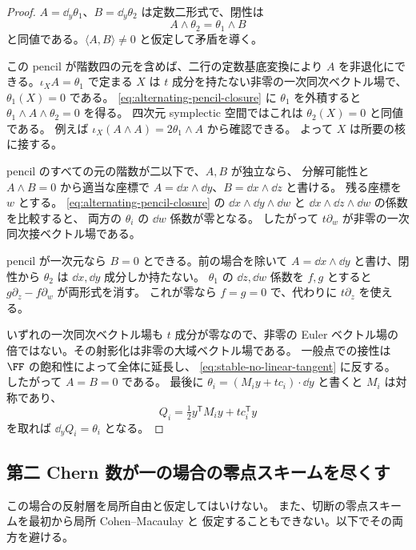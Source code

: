 \begin{proof}
$A=\dd_y\theta_1$、$B=\dd_y\theta_2$ は定数二形式で、閉性は
\begin{equation}
 A\wedge\theta_2=\theta_1\wedge B
 \label{eq:alternating-pencil-closure}
\end{equation}
と同値である。$\langle A,B\rangle\neq0$ と仮定して矛盾を導く。

この pencil が階数四の元を含めば、二行の定数基底変換により
$A$ を非退化にできる。$\iota_XA=\theta_1$ で定まる $X$ は
$t$ 成分を持たない非零の一次同次ベクトル場で、
$\theta_1(X)=0$ である。
\eqref{eq:alternating-pencil-closure} に $\theta_1$ を外積すると
$\theta_1\wedge A\wedge\theta_2=0$ を得る。
四次元 symplectic 空間ではこれは $\theta_2(X)=0$ と同値である。
例えば $\iota_X(A\wedge A)=2\theta_1\wedge A$ から確認できる。
よって $X$ は所要の核に接する。

pencil のすべての元の階数が二以下で、$A,B$ が独立なら、
分解可能性と $A\wedge B=0$ から適当な座標で
$A=\dd x\wedge\dd y$、$B=\dd x\wedge\dd z$ と書ける。
残る座標を $w$ とする。
\eqref{eq:alternating-pencil-closure} の
$\dd x\wedge\dd y\wedge\dd w$ と
$\dd x\wedge\dd z\wedge\dd w$ の係数を比較すると、
両方の $\theta_i$ の $\dd w$ 係数が零となる。
したがって $t\partial_w$ が非零の一次同次接ベクトル場である。

pencil が一次元なら $B=0$ とできる。前の場合を除いて
$A=\dd x\wedge\dd y$ と書け、閉性から $\theta_2$ は
$\dd x,\dd y$ 成分しか持たない。
$\theta_1$ の $\dd z,\dd w$ 係数を $f,g$ とすると
$g\partial_z-f\partial_w$ が両形式を消す。
これが零なら $f=g=0$ で、代わりに $t\partial_z$ を使える。

いずれの一次同次ベクトル場も $t$ 成分が零なので、非零の Euler
ベクトル場の倍ではない。その射影化は非零の大域ベクトル場である。
一般点での接性は $\FF$ の飽和性によって全体に延長し、
\eqref{eq:stable-no-linear-tangent} に反する。
したがって $A=B=0$ である。
最後に $\theta_i=(M_i y+t c_i)\cdot\dd y$ と書くと $M_i$ は対称であり、
\[
 Q_i=\tfrac12 y^{\mathsf T}M_i y+t c_i^{\mathsf T}y
\]
を取れば $\dd_yQ_i=\theta_i$ となる。
\end{proof}

\subsection{第二 Chern 数が一の場合の零点スキームを尽くす}

この場合の反射層を局所自由と仮定してはいけない。
また、切断の零点スキームを最初から局所 Cohen--Macaulay と
仮定することもできない。以下でその両方を避ける。

